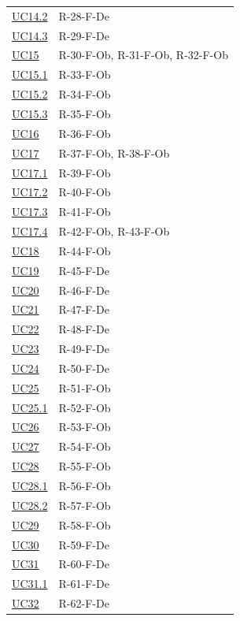 \documentclass[a4paper, 11pt]{article}
\begin{document}
\begin{longtable}[c]{ >{\centering\arraybackslash}m{2.5cm} >{\centering\arraybackslash}m{10cm} }
    \hyperref[UC14.2]{UC14.2} & R-28-F-De \\
    \hyperref[UC14.3]{UC14.3} & R-29-F-De \\
    \hyperref[UC15]{UC15} & R-30-F-Ob, R-31-F-Ob, R-32-F-Ob \\
    \hyperref[UC15.1]{UC15.1} & R-33-F-Ob \\
    \hyperref[UC15.2]{UC15.2} & R-34-F-Ob \\
    \hyperref[UC15.3]{UC15.3} & R-35-F-Ob \\
    \hyperref[UC16]{UC16} & R-36-F-Ob \\
    \hyperref[UC17]{UC17} & R-37-F-Ob, R-38-F-Ob \\
    \hyperref[UC17.1]{UC17.1} & R-39-F-Ob \\
    \hyperref[UC17.2]{UC17.2} & R-40-F-Ob \\
    \hyperref[UC17.3]{UC17.3} & R-41-F-Ob \\
    \hyperref[UC17.4]{UC17.4} & R-42-F-Ob, R-43-F-Ob \\
    \hyperref[UC18]{UC18} & R-44-F-Ob \\
    \hyperref[UC19]{UC19} & R-45-F-De \\
    \hyperref[UC20]{UC20} & R-46-F-De \\
    \hyperref[UC21]{UC21} & R-47-F-De \\
    \hyperref[UC22]{UC22} & R-48-F-De \\
    \hyperref[UC23]{UC23} & R-49-F-De \\
    \hyperref[UC24]{UC24} & R-50-F-De \\
    \hyperref[UC25]{UC25} & R-51-F-Ob \\
    \hyperref[UC25.1]{UC25.1} & R-52-F-Ob \\
    \hyperref[UC26]{UC26} & R-53-F-Ob \\
    \hyperref[UC27]{UC27} & R-54-F-Ob \\
    \hyperref[UC28]{UC28} & R-55-F-Ob \\
    \hyperref[UC28.1]{UC28.1} & R-56-F-Ob \\
    \hyperref[UC28.2]{UC28.2} & R-57-F-Ob \\
    \hyperref[UC29]{UC29} & R-58-F-Ob \\
    \hyperref[UC30]{UC30} & R-59-F-De \\
    \hyperref[UC31]{UC31} & R-60-F-De \\
    \hyperref[UC31.1]{UC31.1} & R-61-F-De \\
    \hyperref[UC32]{UC32} & R-62-F-De \\

\end{longtable}
\end{document}
